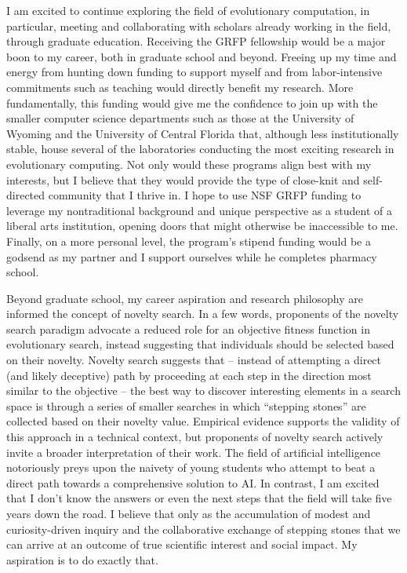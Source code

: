 \documentclass[12pt]{book}
\begin{document}

I am excited to continue exploring the field of evolutionary computation, in particular, meeting and collaborating with scholars already working in the field, through graduate education. Receiving the GRFP fellowship would be a major boon to my career, both in graduate school and beyond. Freeing up my time and energy from hunting down funding to support myself and from labor-intensive commitments such as teaching would directly benefit my research. More fundamentally, this funding would give me the confidence to join up with the smaller computer science departments such as those at the University of Wyoming and the University of Central Florida that, although less institutionally stable, house several of the laboratories conducting the most exciting research in evolutionary computing. Not only would these programs align best with my interests, but I believe that they would provide the type of close-knit and self-directed community that I thrive in. I hope to use NSF GRFP funding to leverage my nontraditional background and unique perspective as a student of a liberal arts institution, opening doors that might otherwise be inaccessible to me. Finally, on a more personal level, the program's stipend funding would be a godsend as my partner and I support ourselves while he completes pharmacy school.

Beyond graduate school, my career aspiration and research philosophy are informed the concept of novelty search. In a few words, proponents of the novelty search paradigm advocate a reduced role for an objective fitness function in evolutionary search, instead suggesting that individuals should be selected based on their novelty. Novelty search suggests that -- instead of attempting a direct (and likely deceptive) path by proceeding at each step in the direction most similar to the objective -- the best way to discover interesting elements in a search space is through a series of smaller searches in which ``stepping stones'' are collected based on their novelty value. Empirical evidence supports the validity of this approach in a technical context, but proponents of novelty search actively invite a broader interpretation of their work. The field of artificial intelligence notoriously preys upon the naivety of young students who attempt to beat a direct path towards a comprehensive solution to AI. In contrast, I am excited that I don't know the answers or even the next steps that the field will take five years down the road. I believe that only as the accumulation of modest and curiosity-driven inquiry and the collaborative exchange of stepping stones that we can arrive at an outcome of true scientific interest and social impact. My aspiration is to do exactly that.
\end{document}
